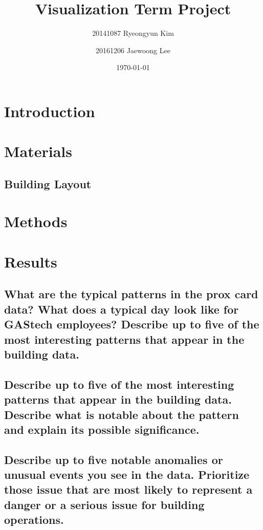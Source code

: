 \documentclass[aps, 10pt, a4paper]{article}
\title{Visualization Term Project}
\author{20141087 Ryeongyun Kim \and 20161206 Jaewoong Lee}
\date{\today}
\begin{document}
    \maketitle
    \newpage
    
    \tableofcontents
    \listoftables
    \listoffigures
    \newpage
    
    \section{Introduction}
    
    \section{Materials}
        \subsection{Building Layout}
    
    \section{Methods}
    
    \section{Results}
        \subsection[Question 1]{What are the typical patterns in the prox card data? What does a typical day look like for GAStech employees? Describe up to five of the most interesting patterns that appear in the building data.}
        
        \subsection[Question 2]{Describe up to five of the most interesting patterns that appear in the building data. Describe what is notable about the pattern and explain its possible significance.}
        
        \subsection[Question 3]{Describe up to five notable anomalies or unusual events you see in the data. Prioritize those issue that are most likely to represent a danger or a serious issue for building operations.}
        
\end{document}
